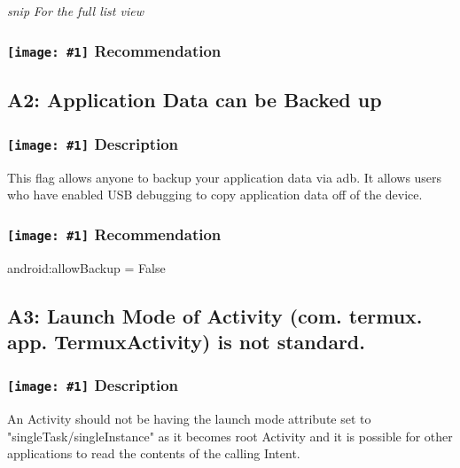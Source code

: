 \documentclass[12p]{article}
\newcommand{\icon}[1]{\texttt{[image: \#1]}}
\begin{document}



\textit{snip}
\newline \textsl{For the full list view }
\subsubsection*{\protect\icon{/home/miki/Documents/GITHUB/AndroidPermissions/python/vulns/report_icons/basic_todo.png} Recommendation}

\subsection{A2: Application Data can be Backed up}
\subsubsection*{\protect\icon{/home/miki/Documents/GITHUB/AndroidPermissions/python/vulns/report_icons/basic_sheet.png} Description}
This flag allows anyone to backup your application data via adb. It allows users who have enabled USB debugging to copy application data off of the device.
\subsubsection*{\protect\icon{/home/miki/Documents/GITHUB/AndroidPermissions/python/vulns/report_icons/basic_todo.png} Recommendation}
android:allowBackup = False
\subsection{A3: Launch Mode of Activity (com. termux. app. TermuxActivity) is not standard.}
\subsubsection*{\protect\icon{/home/miki/Documents/GITHUB/AndroidPermissions/python/vulns/report_icons/basic_sheet.png} Description}
An Activity should not be having the launch mode attribute set to "singleTask/singleInstance" as it becomes root Activity and it is possible for other applications to read the contents of the calling Intent.
\end{document}
